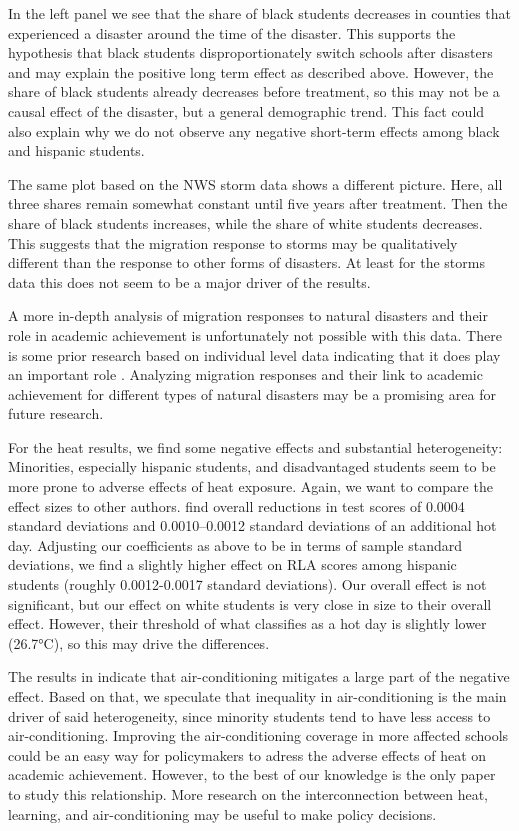 In the left panel we see that the share of black students decreases in counties that experienced a disaster around the time of the disaster. This supports the hypothesis that black students disproportionately switch schools after disasters and may explain the positive long term effect as described above. However, the share of black students already decreases before treatment, so this may not be a causal effect of the disaster, but a general demographic trend. This fact could also explain why we do not observe any negative short-term effects among black and hispanic students.

The same plot based on the NWS storm data shows a different picture. Here, all three shares remain somewhat constant until five years after treatment. Then the share of black students increases, while the share of white students decreases. This suggests that the migration response to storms may be qualitatively different than the response to other forms of disasters. At least for the storms data this does not seem to be a major driver of the results.

A more in-depth analysis of migration responses to natural disasters and their role in academic achievement is unfortunately not possible with this data. There is some prior research based on individual level data indicating that it does play an important role \citep[for example][]{Sacerdote_2012}. Analyzing migration responses and their link to academic achievement for different types of natural disasters may be a promising area for future research.

For the heat results, we find some negative effects and substantial heterogeneity: Minorities, especially hispanic students, and disadvantaged students seem to be more prone to adverse effects of heat exposure. Again, we want to compare the effect sizes to other authors. \cite{Park_2020} find overall reductions in test scores of 0.0004 standard deviations and 0.0010–0.0012 standard deviations of an additional hot day. Adjusting our coefficients as above to be in terms of sample standard deviations, we find a slightly higher effect on RLA scores among hispanic students (roughly 0.0012-0.0017 standard deviations). Our overall effect is not significant, but our effect on white students is very close in size to their overall effect. However, their threshold of what classifies as a hot day is slightly lower (26.7°C), so this may drive the differences.

The results in \cite{Goodman_2020} indicate that air-conditioning mitigates a large part of the negative effect. Based on that, we speculate that inequality in air-conditioning is the main driver of said heterogeneity, since minority students tend to have less access to air-conditioning. Improving the air-conditioning coverage in more affected schools could be an easy way for policymakers to adress the adverse effects of heat on academic achievement. However, to the best of our knowledge \cite{Goodman_2020} is the only paper to study this relationship. More research on the interconnection between heat, learning, and air-conditioning may be useful to make policy decisions.

